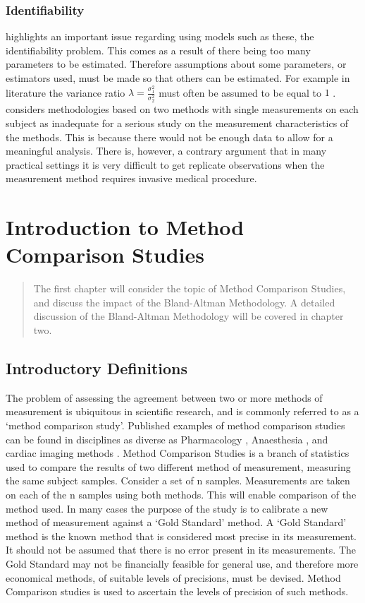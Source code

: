 \documentclass[12pt, a4paper]{report}
\theoremstyle{plain}
\theoremstyle{definition}
\theoremstyle{remark}
\begin{document}
	\subsection{Identifiability}
	\citet{DunnSEME} highlights an important issue regarding using
	models such as these, the identifiability problem. This comes as a result of there being too many parameters to be estimated.
	Therefore assumptions about some parameters, or estimators used,
	must be made so that others can be estimated. For example in literature the variance
	ratio $\lambda=\frac{\sigma^{2}_{1}}{\sigma^{2}_{2}}$
	must often be assumed to be equal to $1$ \citep{linnet98}.\citet{DunnSEME} considers methodologies based on two methods with single measurements on each subject as inadequate for a serious
	study on the measurement characteristics of the methods. This is
	because there would not be enough data to allow for a meaningful
	analysis. There is, however, a contrary argument that in many
	practical settings it is very difficult to get replicate
	observations when the measurement method requires invasive medical
	procedure.
	
	
	
	
	\chapter{Introduction to Method Comparison Studies}
	\begin{abstract}
		The first chapter will consider the topic of Method Comparison Studies, and discuss the impact of the Bland-Altman Methodology. A detailed discussion of the Bland-Altman Methodology will be covered in chapter two.
	\end{abstract}
	
	
	\section{Introductory Definitions}
	
	
	
	
	The problem of assessing the agreement between two or more methods of measurement is ubiquitous in scientific research, and is commonly referred to as a `method comparison study'. Published examples of method comparison studies can be found in disciplines
	as diverse as Pharmacology \citep{ludbrook97}, Anaesthesia \citep{Myles}, and cardiac imaging methods \citep{Krumm}.
	\smallskip
	Method Comparison Studies is a branch of statistics used to compare the results of two different method of measurement, measuring the same subject samples. Consider a set of n samples. Measurements are taken on each of the n samples using both methods. This will enable comparison of the method used.
	\smallskip
	In many cases the purpose of the study is to calibrate a new method of measurement against a ‘Gold Standard’ method. A ‘Gold Standard’ method is the known method that is considered most precise in its measurement. It should not be assumed that there is no error present in its measurements.
	\smallskip
	The Gold Standard may not be financially feasible for general use, and therefore more economical methods, of suitable levels of precisions, must be devised. Method Comparison studies is used to ascertain the levels of precision of such methods.
	\smallskip
	
\end{document}
